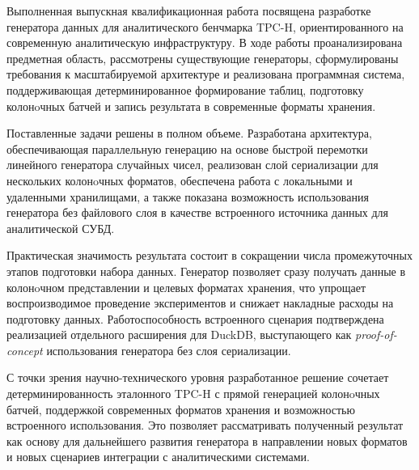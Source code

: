 Выполненная выпускная квалификационная работа посвящена разработке генератора
данных для аналитического бенчмарка TPC-H, ориентированного на современную
аналитическую инфраструктуру. В ходе работы проанализирована предметная
область, рассмотрены существующие генераторы, сформулированы требования к
масштабируемой архитектуре и реализована программная система, поддерживающая
детерминированное формирование таблиц, подготовку колонoчных батчей и запись
результата в современные форматы хранения.

Поставленные задачи решены в полном объеме. Разработана архитектура,
обеспечивающая параллельную генерацию на основе быстрой перемотки линейного
генератора случайных чисел, реализован слой сериализации для нескольких
колонoчных форматов, обеспечена работа с локальными и удаленными хранилищами,
а также показана возможность использования генератора без файлового слоя в
качестве встроенного источника данных для аналитической СУБД.

Практическая значимость результата состоит в сокращении числа промежуточных
этапов подготовки набора данных. Генератор позволяет сразу получать данные в
колонoчном представлении и целевых форматах хранения, что упрощает
воспроизводимое проведение экспериментов и снижает накладные расходы на
подготовку данных. Работоспособность встроенного сценария подтверждена
реализацией отдельного расширения для DuckDB, выступающего как
\textit{proof-of-concept} использования генератора без слоя сериализации.

С точки зрения научно-технического уровня разработанное решение сочетает
детерминированность эталонного TPC-H с прямой генерацией колонoчных батчей,
поддержкой современных форматов хранения и возможностью встроенного
использования. Это позволяет рассматривать полученный результат как основу для
дальнейшего развития генератора в направлении новых форматов и новых
сценариев интеграции с аналитическими системами.
